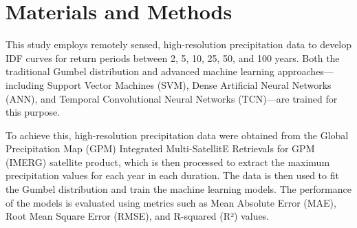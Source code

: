 \section{Materials and Methods}
This study employs remotely sensed, high-resolution precipitation data to develop IDF curves for return periods between 2, 5, 10, 25, 50, and 100 years. Both the traditional Gumbel distribution and advanced machine learning approaches—including Support Vector Machines (SVM), Dense Artificial Neural Networks (ANN), and Temporal Convolutional Neural Networks (TCN)—are trained for this purpose.

To achieve this, high-resolution precipitation data were obtained from the Global Precipitation Map (GPM) Integrated Multi-SatellitE Retrievals for GPM (IMERG) satellite product, which is then processed to extract the maximum precipitation values for each year in each duration. The data is then used to fit the Gumbel distribution and train the machine learning models. The performance of the models is evaluated using metrics such as Mean Absolute Error (MAE), Root Mean Square Error (RMSE), and R-squared (R²) values.







